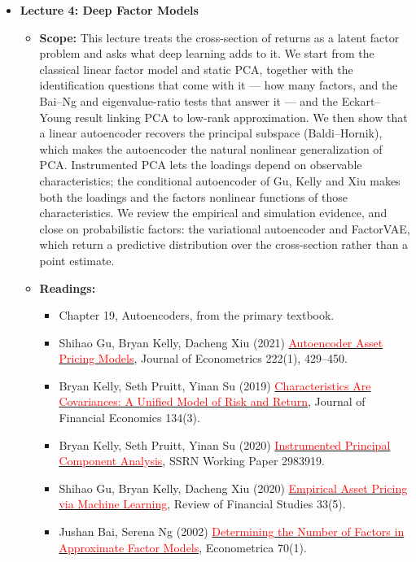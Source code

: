 \documentclass[11pt]{article}
\begin{document}
\begin{itemize}
\item \textbf{Lecture 4: Deep Factor Models}
  \begin{itemize}
    \item \textbf{Scope:} This lecture treats the cross-section of returns as a latent
      factor problem and asks what deep learning adds to it. We start from the classical linear factor model and static PCA, together
      with the identification questions that come with it --- how many factors, and
      the Bai--Ng and eigenvalue-ratio tests that answer it --- and the
      Eckart--Young result linking PCA to low-rank approximation. We then show that
      a linear autoencoder recovers the principal subspace (Baldi--Hornik), which
      makes the autoencoder the natural nonlinear generalization of PCA.
      Instrumented PCA lets the loadings depend on observable characteristics; the
      conditional autoencoder of Gu, Kelly and Xiu makes both the loadings and the
      factors nonlinear functions of those characteristics. We review the empirical
      and simulation evidence, and close on probabilistic factors: the variational
      autoencoder and FactorVAE, which return a predictive distribution over the
      cross-section rather than a point estimate.
    \item \textbf{Readings:}
      \begin{itemize}
        \item Chapter 19, Autoencoders, from the primary textbook.
        \item Shihao Gu, Bryan Kelly, Dacheng Xiu (2021) \href{https://papers.ssrn.com/sol3/papers.cfm?abstract_id=3335536}{\textcolor{red}{Autoencoder Asset Pricing Models}}, Journal of Econometrics 222(1), 429--450.
        \item Bryan Kelly, Seth Pruitt, Yinan Su (2019) \href{https://www.nber.org/papers/w24540}{\textcolor{red}{Characteristics Are Covariances: A Unified Model of Risk and Return}}, Journal of Financial Economics 134(3).
        \item Bryan Kelly, Seth Pruitt, Yinan Su (2020) \href{https://doi.org/10.2139/ssrn.2983919}{\textcolor{red}{Instrumented Principal Component Analysis}}, SSRN Working Paper 2983919.
        \item Shihao Gu, Bryan Kelly, Dacheng Xiu (2020) \href{https://doi.org/10.1093/rfs/hhaa009}{\textcolor{red}{Empirical Asset Pricing via Machine Learning}}, Review of Financial Studies 33(5).
        \item Jushan Bai, Serena Ng (2002) \href{https://doi.org/10.1111/1468-0262.00273}{\textcolor{red}{Determining the Number of Factors in Approximate Factor Models}}, Econometrica 70(1).

\end{itemize}
\end{itemize}
\end{itemize}
\end{document}
